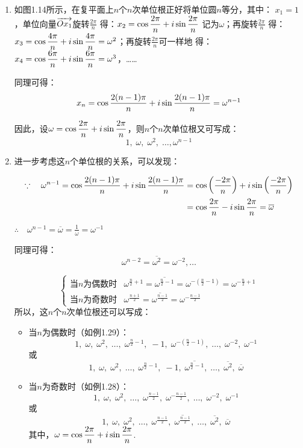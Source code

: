 \begin{enumerate}
\item 如图1.14所示，在复平面上$n$个$n$次单位根正好将单位圆$n$等分，其中：
$x_1=1$，单位向量$\overrightarrow{Ox_1}$旋转$\frac{2\pi}{n}$
得：$x_2=\cos{\dfrac{2\pi}{n}}+i\sin{\dfrac{2\pi}{n}}$
记为$\omega$；再旋转$\frac{2\pi}{n}$
得：$x_3=\cos{\dfrac{4\pi}{n}}+i\sin{\dfrac{4\pi}{n}}=\omega^2$；再旋转$\frac{2\pi}{n}$可一样地
得：$x_4=\cos{\dfrac{6\pi}{n}}+i\sin{\dfrac{6\pi}{n}}=\omega^3$，……

同理可得：
\[x_n=\cos{\dfrac{2(n-1)\pi}{n}}+i\sin{\dfrac{2(n-1)\pi}{n}}=\omega^{n-1}\]

因此，设$\omega=\cos{\dfrac{2\pi}{n}}+i\sin{\dfrac{2\pi}{n}}$，则$n$个$n$次单位根又可写成：
\[1,\; \omega,\; \omega^2,\; \ldots, \omega^{n-1}\]

\item 进一步考虑这$n$个单位根的关系，可以发现：

\[\begin{split}
    \because\quad \omega^{n-1}=\cos{\dfrac{2(n-1)\pi}{n}}+i\sin{\dfrac{2(n-1)\pi}{n}}&=\cos\left(\dfrac{-2\pi}{n}\right)+i\sin\left(\dfrac{-2\pi}{n}\right)\\
    &=\cos\dfrac{2\pi}{n}-i\sin\dfrac{2\pi}{n}=\overline{\omega}
\end{split}\]

$\therefore\quad \omega^{n-1}=\overline{\omega}=\frac{1}{\omega}=\omega^{-1}$

同理可得：\[\omega^{n-2}=\overline{\omega^2}=\omega^{-2},\ldots\]

\[\begin{cases}
\text{当$n$为偶数时}& \omega^{\tfrac{n}{2}+1}=\overline{\omega^{\tfrac{n}{2}-1}}=\omega^{-\left(\tfrac{n}{2}-1\right)}=\omega^{-\tfrac{n}{2}+1}\\
\text{当$n$为奇数时}& \omega^{\tfrac{n+1}{2}}=\overline{\omega^{\tfrac{n-1}{2}}}=\omega^{-\tfrac{n-1}{2}}
\end{cases}\]
所以，这$n$个$n$次单位根还可以写成：
\begin{itemize}
    \item 当$n$为偶数时（如例1.29）：
\[1,\; \omega,\; \omega^2,\;\ldots,\;  \omega^{\tfrac{n}{2}-1},\;-1,\;  \omega^{-\left(\tfrac{n}{2}-1\right)},\; \ldots, \;  \omega^{-2},\; \omega^{-1}\]
或
\[1,\; \omega,\; \omega^2,\;\ldots,\;  \omega^{\tfrac{n}{2}-1},\;-1,\;  \overline{\omega^{\tfrac{n}{2}-1}},\; \ldots, \;  \overline{\omega^{2}},\; \overline{\omega}\]

\item 当$n$为奇数时（如例1.28）：
\[1,\; \omega,\; \omega^2,\;\ldots,\;  \omega^{\tfrac{n-1}{2}},\;  \omega^{-\tfrac{n-1}{2}},\; \ldots, \;  \omega^{-2},\; \omega^{-1}\]
或
\[1,\; \omega,\; \omega^2,\;\ldots,\;  \omega^{\tfrac{n-1}{2}},\;  \overline{\omega^{\tfrac{n-1}{2}}},\; \ldots, \;  \overline{\omega^{2}},\; \overline{\omega}\]
其中，$\omega=\cos{\dfrac{2\pi}{n}}+i\sin{\dfrac{2\pi}{n}}$.
\end{itemize}


\end{enumerate}
